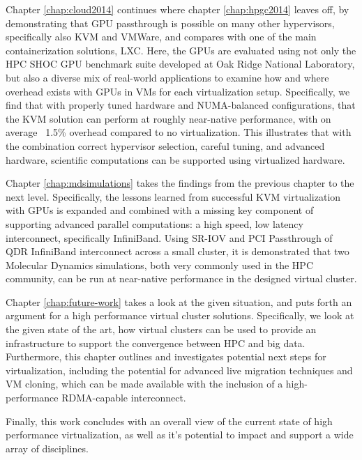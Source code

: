 Chapter \ref{chap:cloud2014} continues where chapter \ref{chap:hpgc2014} leaves off, by demonstrating that GPU passthrough is possible on many other hypervisors, specifically also KVM and VMWare, and compares with one of the main containerization solutions, LXC. Here, the GPUs are evaluated using not only the HPC SHOC GPU benchmark suite developed at Oak Ridge National Laboratory, but also a diverse mix of real-world applications to examine how and where overhead exists with GPUs in VMs for each virtualization setup.  Specifically, we find that with properly tuned hardware and NUMA-balanced configurations, that the KVM solution can perform at roughly near-native performance, with on average ~1.5\% overhead compared to no virtualization. This illustrates that with the combination correct hypervisor selection, careful tuning, and advanced hardware, scientific computations can be supported using virtualized hardware. 

Chapter \ref{chap:mdsimulations} takes the findings from the previous chapter to the next level. Specifically, the lessons learned from successful KVM virtualization with GPUs is expanded and combined with a missing key component of supporting advanced parallel computations: a high speed, low latency interconnect, specifically InfiniBand. Using SR-IOV and PCI Passthrough of QDR InfiniBand interconnect across a small cluster, it is demonstrated that two Molecular Dynamics simulations, both very commonly used in the HPC community, can be run at near-native performance in the designed virtual cluster.

Chapter \ref{chap:future-work} takes a look at the given situation, and puts forth an argument for a high performance virtual cluster solutions. Specifically, we look at the given state of the art, how virtual clusters can be used to provide an infrastructure to support the convergence between HPC and big data. Furthermore, this chapter outlines and investigates potential next steps for virtualization, including the potential for advanced live migration techniques and VM cloning, which can be made available with the inclusion of a high-performance RDMA-capable interconnect. 

Finally, this work concludes with an overall view of the current state of high performance virtualization, as well as it's potential to impact and support a wide array of disciplines. 



